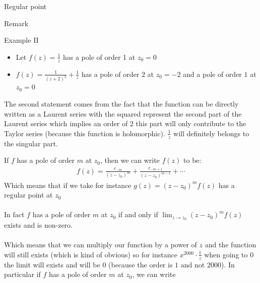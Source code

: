 \begin{parag}{Regular point}
\begin{subparag}{Remark}
	\end{subparag}
	\begin{subparag}{Example II}
		$ $\\
		\begin{itemize}
			\item Let $f\left(z\right) = \frac{1}{z}$ has a pole of order 1 at $z_0 = 0$
			\item $f\left(z\right) = \frac{1}{\left(z + 2\right)^2} + \frac{1}{z}$ has a pole of order $2$ at $z_0 = -2$ and a pole of order $1$ at $z_0 = 0$
		\end{itemize}
		The second statement comes from the fact that the function can be directly written as a Laurent series with the squared represent the second part of the Laurent series which implies an order of $2$ this part will only contribute to the Taylor series (because this function is holomorphic). $\frac{1}{z}$ will definitely belongs to the singular part.
	\end{subparag}
	If $f$ has a pole of order $m$ at $z_0$, then we can write $f\left(z\right)$ to be:
	\begin{align*} 
		f\left(z\right) = \frac{c_{ - m}}{\left(z - z_0\right)^{m}} + \frac{c_{ - m + 1}}{\left(z - z_0\right)^{m-1}} + \cdots
	\end{align*}
	Which means that if we take for instance $g\left(z\right) =  \left(z - z_0\right)^{m}f\left(z\right)$ has a regular point at $z_0$\\
	$ $\\
	In fact $f$ has a pole of order $m$ at $z_0$ if and only if $\lim_{z \to z_0} \left(z - z_0\right)^{m}f\left(z\right)$ exists and is non-zero.\\
	$ $\\
	Which means that we can multiply our function by a power of $z$ and the function will still exists (which is kind of obvious) so for instance $x^{2000} \cdot \frac{1}{z}$ when going to $0$ the limit will exists and will be $0$ (because the order is $1$ and not $2000$). In particular if $f$ has a pole of order $m$ at $z_0$, we can write 


\end{parag}
